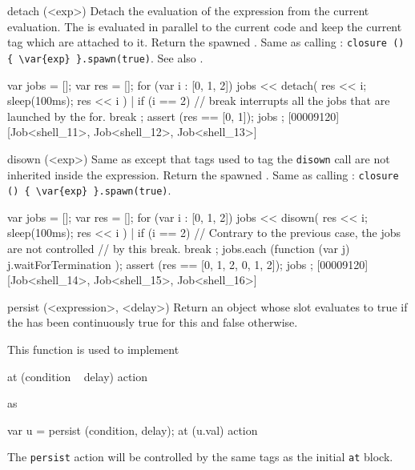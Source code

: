 \begin{urbiscriptapi}
\item[detach](<exp>)%
  Detach the evaluation of the expression  from the current
  evaluation.  The  is evaluated in parallel to the current code
  and keep the current tag which are attached to it.  Return the spawned
  .  Same as calling :
  \lstinline|closure () { \var{exp} }.spawn(true)|.  See also
  .

\begin{urbiscript}
{
  var jobs = [];
  var res = [];
  for (var i : [0, 1, 2])
  {
    jobs << detach({ res << i; sleep(100ms); res << i }) |
    if (i == 2)
      // break interrupts all the jobs that are launched by the for.
      break
  };
  assert (res == [0, 1]);
  jobs
};
[00009120] [Job<shell_11>, Job<shell_12>, Job<shell_13>]
\end{urbiscript}


\item[disown](<exp>)%
  Same as  except that tags used to tag the
  \lstinline|disown| call are not inherited inside the expression.  Return
  the spawned .  Same as calling :
  \lstinline|closure () { \var{exp} }.spawn(true)|.

\begin{urbiscript}
{
  var jobs = [];
  var res = [];
  for (var i : [0, 1, 2])
  {
    jobs << disown({ res << i; sleep(100ms); res << i }) |
    if (i == 2)
      // Contrary to the previous case, the jobs are not controlled
      // by this break.
      break
  };
  jobs.each (function (var j) { j.waitForTermination });
  assert (res == [0, 1, 2, 0, 1, 2]);
  jobs
};
[00009120] [Job<shell_14>, Job<shell_15>, Job<shell_16>]
\end{urbiscript}


\item[persist](<expression>, <delay>)%
  Return an object whose  slot evaluates to true if the
   has been continuously true for this  and false
  otherwise.

  This function is used to implement

\begin{urbiunchecked}
at (condition ~ delay)
  action
\end{urbiunchecked}

  \noindent
  as

\begin{urbiunchecked}
var u = persist (condition, delay);
at (u.val)
  action
\end{urbiunchecked}

  The \lstinline|persist| action will be controlled by the same tags
  as the initial \lstinline|at| block.



\end{urbiscriptapi}



